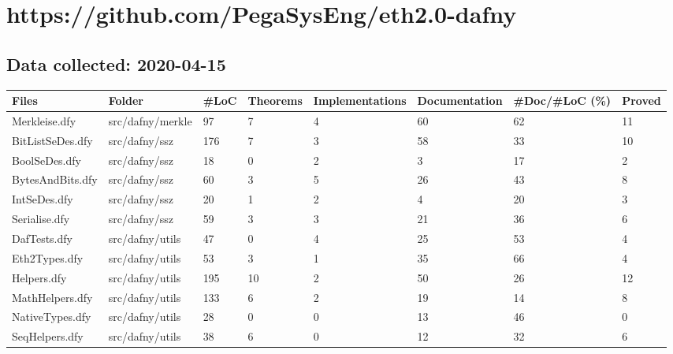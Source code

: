 \documentclass[a4paper, 12pt]{article}
\begin{document}
\section*{https://github.com/PegaSysEng/eth2.0-dafny}
\subsection*{Data collected: 2020-04-15}
\scriptsize
\begin{tabular}{llllllll}
\toprule
                  Files &             Folder & \#LoC & Theorems & Implementations & Documentation & \#Doc/\#LoC (\%) & Proved \\
\midrule
          Merkleise.dfy &   src/dafny/merkle &   97 &        7 &               4 &            60 &            62 &     11 \\
       BitListSeDes.dfy &      src/dafny/ssz &  176 &        7 &               3 &            58 &            33 &     10 \\
          BoolSeDes.dfy &      src/dafny/ssz &   18 &        0 &               2 &             3 &            17 &      2 \\
       BytesAndBits.dfy &      src/dafny/ssz &   60 &        3 &               5 &            26 &            43 &      8 \\
           IntSeDes.dfy &      src/dafny/ssz &   20 &        1 &               2 &             4 &            20 &      3 \\
          Serialise.dfy &      src/dafny/ssz &   59 &        3 &               3 &            21 &            36 &      6 \\
           DafTests.dfy &    src/dafny/utils &   47 &        0 &               4 &            25 &            53 &      4 \\
          Eth2Types.dfy &    src/dafny/utils &   53 &        3 &               1 &            35 &            66 &      4 \\
            Helpers.dfy &    src/dafny/utils &  195 &       10 &               2 &            50 &            26 &     12 \\
        MathHelpers.dfy &    src/dafny/utils &  133 &        6 &               2 &            19 &            14 &      8 \\
        NativeTypes.dfy &    src/dafny/utils &   28 &        0 &               0 &            13 &            46 &      0 \\
         SeqHelpers.dfy &    src/dafny/utils &   38 &        6 &               0 &            12 &            32 &      6 \\

\end{tabular}
\end{document}
